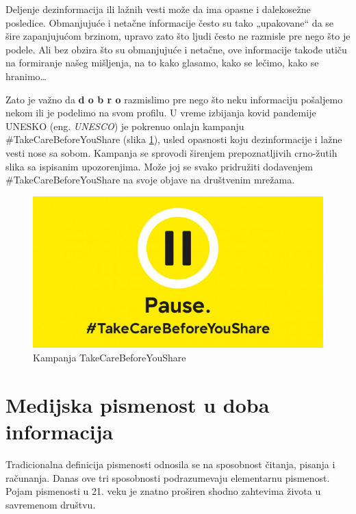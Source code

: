 \documentclass[a4paper]{article}
\begin{document}
Deljenje dezinformacija ili lažnih vesti može da ima opasne i dalekosežne 
posledice. Obmanjujuće i netačne informacije često su tako „upakovane“ da se šire zapanjujućom brzinom, upravo zato što ljudi često ne razmisle pre nego što je podele. \newline
Ali bez obzira što su obmanjujuće i netačne, ove informacije takođe utiču na 
formiranje našeg mišljenja, na to kako glasamo, kako se lečimo, kako se hranimo… 



Zato je važno da \textbf{d o b r o} razmislimo pre nego što neku informaciju 
pošaljemo nekom ili je podelimo na svom profilu. 
U vreme izbijanja kovid pandemije UNESKO (eng. \emph{UNESCO}) je pokrenuo onlajn kampanju \newline
\#TakeCareBeforeYouShare \cite{unesco kampanja} (slika \ref{fig:takecarebeforeyoushare}), usled opasnosti koju dezinformacije i lažne vesti nose sa sobom. Kampanja se sprovodi širenjem prepoznatljivih crno-žutih slika sa ispisanim upozorenjima. Može joj se svako pridružiti dodavenjem \#TakeCareBeforeYouShare na svoje objave na društvenim mrežama.

\begin{figure}[ht!]
\begin{center}
\includegraphics[scale=0.4]{takecarebeforeyoushare.jpg}
\end{center}
\caption{Kampanja TakeCareBeforeYouShare}
\label{fig:takecarebeforeyoushare}
\end{figure}

\newpage
\section{Medijska pismenost u doba informacija}
\label{sec:naslov4}

Tradicionalna definicija pismenosti odnosila se na sposobnost čitanja, pisanja i računanja. Danas ove tri sposobnosti podrazumevaju elementarnu pismenost. Pojam pismenosti u 21. veku je znatno proširen shodno zahtevima života u savremenom društvu.
\end{document}
